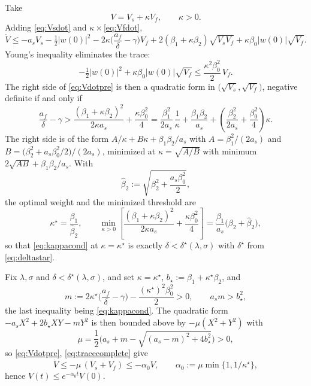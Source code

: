 \documentclass[12pt]{article}
\theoremstyle{plain}
\theoremstyle{remark}
\begin{document}
Take
\begin{equation}
 V=V_s+\kappa V_f,\qquad\kappa>0 .
 \label{eq:Vcomp}
\end{equation}
Adding \eqref{eq:Vsdot} and $\kappa\times$\eqref{eq:Vfdot},
\begin{equation}
 \dot V
 \le-a_sV_s-\tfrac12|w(0)|^2
 -2\kappa\Big(\frac{a_f}{\delta}-\gamma\Big)V_f
 +2(\beta_1+\kappa\beta_2)\sqrt{V_sV_f}
 +\kappa\beta_0|w(0)|\sqrt{V_f}.
 \label{eq:Vdotpre}
\end{equation}
Young's inequality eliminates the trace:
\begin{equation}
 -\tfrac12|w(0)|^2+\kappa\beta_0|w(0)|\sqrt{V_f}
 \le\frac{\kappa^2\beta_0^2}{2}\,V_f .
 \label{eq:tracecomplete}
\end{equation}
The right side of \eqref{eq:Vdotpre} is then a quadratic form in $\big(\sqrt{V_s},\sqrt{V_f}\big)$, negative definite if and only if
\begin{equation}
 \frac{a_f}{\delta}-\gamma
 >\frac{(\beta_1+\kappa\beta_2)^2}{2\kappa a_s}
 +\frac{\kappa\beta_0^2}{4}
 =\frac{\beta_1^2}{2a_s}\,\frac1\kappa
 +\frac{\beta_1\beta_2}{a_s}
 +\left(\frac{\beta_2^2}{2a_s}+\frac{\beta_0^2}{4}\right)\kappa .
 \label{eq:kappacond}
\end{equation}
The right side is of the form $A/\kappa+B\kappa+\beta_1\beta_2/a_s$ with $A=\beta_1^2/(2a_s)$ and $B=\big(\beta_2^2+a_s\beta_0^2/2\big)/(2a_s)$, minimized at $\kappa=\sqrt{A/B}$ with minimum $2\sqrt{AB}+\beta_1\beta_2/a_s$. With
\begin{equation}
 \widehat\beta_2:=\sqrt{\beta_2^2+\frac{a_s\beta_0^2}{2}},
 \label{eq:betahat}
\end{equation}
the optimal weight and the minimized threshold are
\begin{equation}
 \kappa^\star=\frac{\beta_1}{\widehat\beta_2},
 \qquad
 \min_{\kappa>0}\left[\frac{(\beta_1+\kappa\beta_2)^2}{2\kappa a_s}
 +\frac{\kappa\beta_0^2}{4}\right]
 =\frac{\beta_1}{a_s}\big(\beta_2+\widehat\beta_2\big),
 \label{eq:kappastar}
\end{equation}
so that \eqref{eq:kappacond} at $\kappa=\kappa^\star$ is exactly $\delta<\delta^\star(\lambda,\sigma)$ with $\delta^\star$ from \eqref{eq:deltastar}.

Fix $\lambda,\sigma$ and $\delta<\delta^\star(\lambda,\sigma)$, and set $\kappa=\kappa^\star$, $b_\star:=\beta_1+\kappa^\star\beta_2$, and
\begin{equation}
 m:=2\kappa^\star\Big(\frac{a_f}{\delta}-\gamma\Big)-\frac{(\kappa^\star)^2\beta_0^2}{2}>0,
 \qquad
 a_sm>b_\star^2,
 \label{eq:margin}
\end{equation}
the last inequality being \eqref{eq:kappacond}. The quadratic form $-a_sX^2+2b_\star XY-mY^2$ is then bounded above by $-\mu(X^2+Y^2)$ with
\begin{equation}
 \mu=\frac12\Big(a_s+m-\sqrt{(a_s-m)^2+4b_\star^2}\Big)>0,
 \label{eq:mu}
\end{equation}
so \eqref{eq:Vdotpre}, \eqref{eq:tracecomplete} give
\begin{equation}
 \dot V\le-\mu\,(V_s+V_f)\le-\alpha_0V,
 \qquad
 \alpha_0:=\mu\min\{1,1/\kappa^\star\},
 \label{eq:Vdecay}
\end{equation}
hence $V(t)\le e^{-\alpha_0t}V(0)$.
\end{document}

